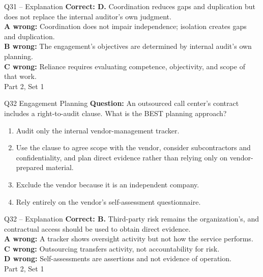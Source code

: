 \documentclass[aspectratio=169,10pt]{beamer}
\begin{document}
\begin{frame}[t]{Q31 -- Explanation}
	\footnotesize
	\textbf{Correct: D.} Coordination reduces gaps and duplication but does not replace the internal auditor's own judgment. \\[5pt]
\textbf{A wrong:} Coordination does not impair independence; isolation creates gaps and duplication. \\[3pt]
\textbf{B wrong:} The engagement's objectives are determined by internal audit's own planning. \\[3pt]
\textbf{C wrong:} Reliance requires evaluating competence, objectivity, and scope of that work. \\[3pt]
	\vfill {\tiny Part 2, Set 1}
\end{frame}
\begin{frame}[t]{Q32 \hfill {\scriptsize Engagement Planning}}
	\small
	\textbf{Question:} An outsourced call center's contract includes a right-to-audit clause. What is the BEST planning approach?
	\begin{enumerate}[label=\Alph*.,itemsep=1pt,topsep=3pt]
			\item Audit only the internal vendor-management tracker.
			\item Use the clause to agree scope with the vendor, consider subcontractors and confidentiality, and plan direct evidence rather than relying only on vendor-prepared material.
			\item Exclude the vendor because it is an independent company.
			\item Rely entirely on the vendor's self-assessment questionnaire.
	\end{enumerate}
\end{frame}
\begin{frame}[t]{Q32 -- Explanation}
	\footnotesize
	\textbf{Correct: B.} Third-party risk remains the organization's, and contractual access should be used to obtain direct evidence. \\[5pt]
\textbf{A wrong:} A tracker shows oversight activity but not how the service performs. \\[3pt]
\textbf{C wrong:} Outsourcing transfers activity, not accountability for risk. \\[3pt]
\textbf{D wrong:} Self-assessments are assertions and not evidence of operation. \\[3pt]
	\vfill {\tiny Part 2, Set 1}
\end{frame}
\end{document}
